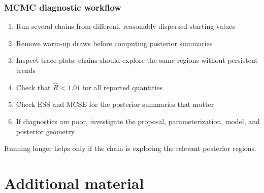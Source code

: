 \documentclass[10pt]{beamer}
\begin{document}
\begin{frame}

\frametitle{MCMC diagnostic workflow}

  \begin{enumerate}
  \item Run several chains from different, reasonably dispersed starting
    values
  \item Remove warm-up draws before computing posterior summaries
  \item Inspect trace plots: chains should explore the same regions without
    persistent trends
  \item Check that $\widehat R<1.01$ for all reported quantities
  \item Check ESS and MCSE for the posterior summaries that matter
  \item If diagnostics are poor, investigate the proposal, parameterization,
    model, and posterior geometry
  \end{enumerate}

  \pause
  \vspace{0.5\baselineskip}
  {\color{uured}Running longer helps only if the chain is exploring the
  relevant posterior regions.}

\end{frame}

\section{Additional material}
\frame{\sectionpage}


\end{document}
